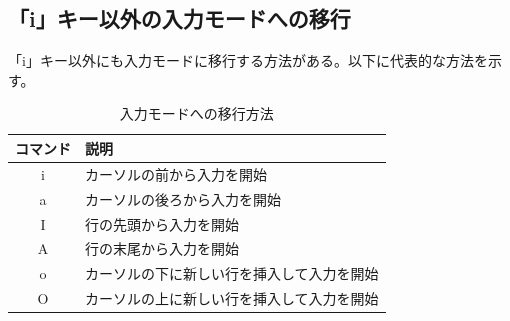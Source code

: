 \documentclass[a4paper, 11pt, dvipdfmx]{jsarticle}
\begin{document}
\subsection{「i」キー以外の入力モードへの移行}
「i」キー以外にも入力モードに移行する方法がある。以下に代表的な方法を示す。
\begin{table}[H]
  \centering
  \caption{入力モードへの移行方法}
  \begin{tabular}{|c|l|} \hline
    コマンド & 説明 \\ \hline
    i & カーソルの前から入力を開始 \\
    a & カーソルの後ろから入力を開始 \\
    I & 行の先頭から入力を開始 \\
    A & 行の末尾から入力を開始 \\
    o & カーソルの下に新しい行を挿入して入力を開始 \\
    O & カーソルの上に新しい行を挿入して入力を開始 \\ \hline
  \end{tabular}
\end{table}
\end{document}
